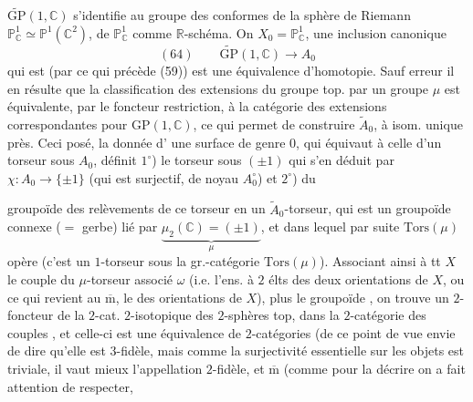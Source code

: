 $\widetilde{\mathrm{GP}}(1,\mathbb C)$ s'identifie au groupe des  conformes
de la sphère de Riemann  $\mathbb P^1_{\mathbb C}\simeq\mathbb P^1(\mathbb C^2)$,
  de $\mathbb P^1_{\mathbb C}$ comme $\mathbb R$-schéma.
On  $X_0=\mathbb P^1_{\mathbb C}$, 
une inclusion canonique
\[
(64)\qquad \widetilde{\mathrm{GP}}(1,\mathbb C)\longrightarrow A_0
\]
qui est (par ce qui précède (59)) est une
équivalence d'homotopie. Sauf erreur
il en résulte  que la classification des
extensions du groupe top.  par un groupe
 $\mu$ est équivalente, par le foncteur
restriction, à la catégorie des extensions
correspondantes pour  $\mathrm{GP}(1,\mathbb C)$, ce qui
permet de construire $\widetilde A_0$, à isom.
unique près. Ceci posé, la donnée d'
une surface  de genre $0$, qui équivaut
à celle d'un torseur \unsure{$[\mathrm{Isom}(\mathbb P^1_{\mathbb C},X))$|$(\mathrm{Isom}(\mathbb P^1_{\mathbb C},X))$}
sous $A_0$, définit $1^\circ$) le torseur sous
$(\pm1)$ qui s'en déduit par $\chi:A_0\longrightarrow\{\pm1\}$
(qui est surjectif, de noyau $A_0^\circ$) et \unsure{$\varphi$} $2^\circ$) du

groupoïde des relèvements de ce 
torseur en un $\widetilde A_0$-torseur, qui est
un groupoïde connexe ($=$ gerbe) lié par 
$\underbrace{\mu_2(\mathbb C)=(\pm1)}_{\mu}$,
et dans lequel par suite $\mathrm{Tors}(\mu)$  opère
(c'est un $1$-torseur sous la gr.-catégorie
$\mathrm{Tors}(\mu)$). Associant ainsi à tt $X$
le couple  du $\mu$-torseur associé $\omega$
(i.e. l'ens. à $2$ élts des deux orientations de
$X$, ou ce qui revient au $\overline{\mathrm m}$, le 
des orientations de $X$), plus le \inserted{$\mu$-}groupoïde
, on trouve un $2$-foncteur de la
$2$-cat. $2$-isotopique des $2$-sphères top,
dans la $2$-catégorie des couples ,
et celle-ci est une équivalence de
$2$-catégories (de ce point de vue 
envie de dire qu'elle est $3$-fidèle,
mais comme  la surjectivité essentielle
sur les objets est triviale, il vaut mieux
l'appellation $2$-fidèle, et $\overline{\mathrm m}$ (comme pour
la décrire on a fait attention de respecter,

